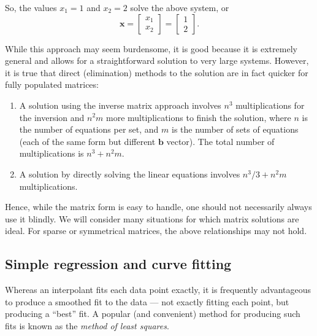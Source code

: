 So, the values $x_1 = 1$ and $x_2 = 2$ solve the above system, or
\begin{equation}
\mathbf{x} = \left[ \begin{array}{c}
x_1\\ x_2 \end{array} \right]
=
\left[ \begin{array}{c}
1\\ 2 \end{array} 
\right ] .
\end{equation}	 

While this approach may seem burdensome, it is good because it is extremely general and 
allows for a straightforward solution to very large systems. However, it is 
true that direct (elimination) methods to the solution are in fact quicker for fully populated 
matrices:

\begin{enumerate}
\item 	A solution using the inverse matrix approach involves $n^3$ multiplications for the inversion and $n^2m$ 
more multiplications to finish the solution, where $n$ is the number of equations per set, and $m$ 
is the number of sets of equations (each of the same form but different $\mathbf{b}$ vector). The total 
number of multiplications is $n^3 + n^2m$.
\item	A solution by directly solving the linear equations involves $n^3/3 + n^2m$ multiplications.
\end{enumerate}

Hence, while the matrix form is easy to handle, one should not necessarily always use it blindly. We 
will consider many situations for which matrix solutions are ideal. For sparse or symmetrical 
matrices, the above relationships may not hold.

\subsection{Simple regression and curve fitting}

	Whereas an interpolant fits each data point exactly, it is frequently advantageous to produce a 
smoothed fit to the data --- not exactly fitting each point, but producing a ``best'' fit. A popular (and 
convenient) method for producing such fits is known as the \emph{method of least squares}.

